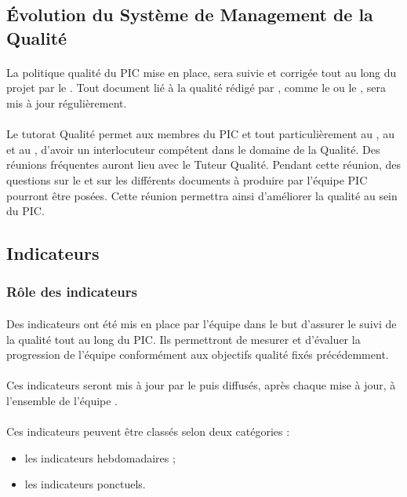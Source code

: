 \subsection{Évolution du Système de Management de la Qualité}

\paragraph*{} La politique qualité du PIC \nomEquipe mise en place, sera suivie et corrigée tout au long
du projet par le \RQ . Tout document lié à la qualité rédigé par \nomEquipe,
comme le \PQ ou le \PGC , sera mis à jour régulièrement.
\paragraph*{} Le tutorat Qualité permet aux membres du PIC et tout particulièrement au \CP, au
\RQ et au \RGC , d’avoir un interlocuteur
compétent dans le domaine de la Qualité. Des réunions fréquentes auront lieu avec le
Tuteur Qualité. Pendant cette réunion, des questions sur le \SMQ et sur les différents documents à produire par l’équipe PIC pourront être posées.
Cette réunion permettra ainsi d’améliorer la qualité au sein du PIC.


\subsection{Indicateurs}
\subsubsection*{Rôle des indicateurs}

\paragraph*{} Des indicateurs ont été mis en place par l'équipe \nomEquipe dans le but d'assurer le suivi
de la qualité tout au long du PIC. Ils permettront de mesurer et d'évaluer la progression de
l'équipe conformément aux objectifs qualité fixés précédemment.

\paragraph*{} Ces indicateurs seront mis à jour par le \RQ puis diffusés, après chaque
mise à jour, à l'ensemble de l'équipe \nomEquipe .

\paragraph*{} Ces indicateurs peuvent être classés selon deux catégories :
\begin{itemize} 
	\item les indicateurs hebdomadaires ;
	\item les indicateurs ponctuels.
 \end{itemize}
